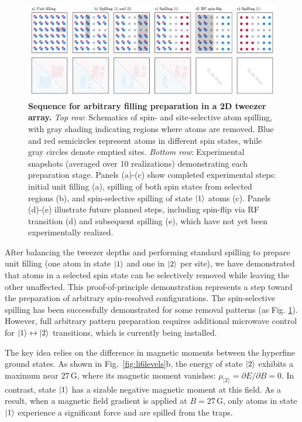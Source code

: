 
\begin{figure}
    \centering
    \includegraphics{fig-ai/preparation-array-ai.pdf}
    \caption[Sequence for arbitrary filling preparation in a 2D tweezer array]{
    \textbf{Sequence for arbitrary filling preparation in a 2D tweezer array.}
    \textit{Top row}: Schematics of spin- and site-selective atom spilling, with gray shading indicating regions where atoms are removed. Blue and red semicircles represent atoms in different spin states, while gray circles denote emptied sites.
    \textit{Bottom row}: Experimental snapshots (averaged over 10 realizations) demonstrating each preparation stage. Panels (a)-(c) show completed experimental steps: initial unit filling (a), spilling of both spin states from selected regions (b), and spin-selective spilling of state $\left| 1 \right\rangle$ atoms (c). Panels (d)-(e) illustrate future planned steps, including spin-flip via RF transition (d) and subsequent spilling (e), which have not yet been experimentally realized.
    }
    \label{fig:preparation-array}
\end{figure}




After balancing the tweezer depths and performing standard spilling to prepare unit filling (one atom in state $\left| 1 \right\rangle$ and one in $\left| 2 \right\rangle$ per site), we have demonstrated that atoms in a selected spin state can be selectively removed while leaving the other unaffected. This proof-of-principle demonstration represents a step toward the preparation of arbitrary spin-resolved configurations. The spin-selective spilling has been successfully demonstrated for some removal patterns (as Fig. \ref{fig:preparation-array}). However, full arbitrary pattern preparation requires additional microwave control for $\left| 1 \right\rangle \leftrightarrow \left| 2 \right\rangle$ transitions, which is currently being installed.

The key idea relies on the difference in magnetic moments between the hyperfine ground states. As shown in Fig.~\ref{fig:li6levels}b, the energy of state $\left| 2 \right\rangle$ exhibits a maximum near $27\,\mathrm{G}$, where its magnetic moment vanishes: $\mu_{|2\rangle} = \partial E / \partial B = 0$. In contrast, state $\left| 1 \right\rangle$ has a sizable negative magnetic moment at this field.
As a result, when a magnetic field gradient is applied at $B = 27\,\mathrm{G}$, only atoms in state $\left| 1 \right\rangle$ experience a significant force and are spilled from the traps.

